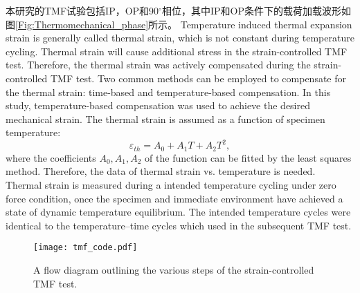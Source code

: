 本研究的TMF试验包括IP，OP和90$^\circ$相位，其中IP和OP条件下的载荷加载波形如图\ref{Fig:Thermomechanical_phase}所示。
Temperature induced thermal expansion strain is generally called thermal strain, which is not constant during temperature cycling. Thermal strain will cause additional stress in the strain-controlled TMF test. Therefore, the thermal strain was actively compensated during the strain-controlled TMF test. Two common methods can be employed to compensate for the thermal strain: time-based and temperature-based compensation. In this study, temperature-based compensation was used to achieve the desired mechanical strain. The thermal strain is assumed as a function of specimen temperature:
\begin{equation}
\varepsilon_{th}=A_0+A_1 T+A_2 T^2,
\label{Equ:thermal_strain_fitting}
\end{equation}
where the coefficients $A_0,A_1,A_2$ of the function can be fitted by the least squares method. Therefore, the data of thermal strain vs. temperature is needed. Thermal strain is measured during a intended temperature cycling under zero force condition, once the specimen and immediate environment have achieved a state of dynamic temperature equilibrium. The intended temperature cycles were identical to the temperature–time cycles which used in the subsequent TMF test. 

\begin{figure}[!htp]
\centering
\texttt{[image: tmf\_code.pdf]}
\caption{A flow diagram outlining the various steps of the strain-controlled TMF test.}
\label{Fig:tmf_code}
\end{figure}

